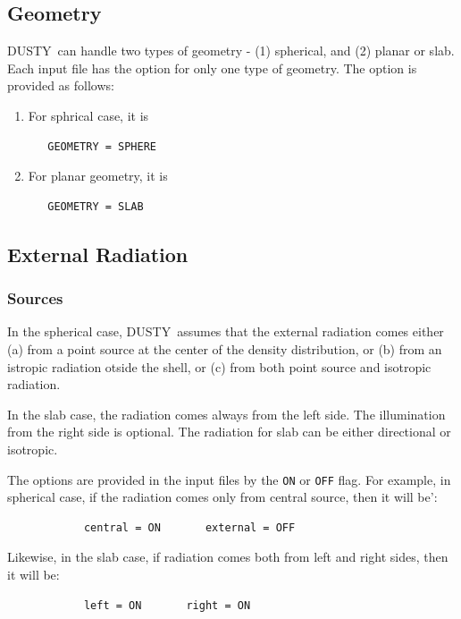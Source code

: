 \documentclass[11pt]{article}
\def\D  {{\sf DUSTY}}
\begin{document}
\subsection{Geometry}
\label{geometry}

\D\ can handle two types of geometry - (1) spherical, and (2) planar or slab. Each input
file has the option for only one type of geometry. The option is provided as follows:
%
\begin{enumerate}
%
\item
  For sphrical case, it is
\begin{verbatim}
   GEOMETRY = SPHERE
\end{verbatim}
%
\item
  For planar geometry, it is
\begin{verbatim}
   GEOMETRY = SLAB
\end{verbatim}
%
\end{enumerate}

\subsection{External Radiation}
\label{phy_parameters}

\subsubsection{Sources}
\label{sources}

In the spherical case, \D\ assumes that the external radiation comes either (a) from a
point source at the center of the density distribution, or (b) from an istropic
radiation otside the shell, or (c) from both point source and isotropic radiation.

In the slab case, the radiation comes always from the left side. The illumination from
the right side is optional. The radiation for slab can be either directional or isotropic.

The options are provided in the input files by the {\tt ON} or {\tt OFF} flag. For example,
in spherical case, if the radiation comes only from central source, then it will be':
%
\begin{verbatim}
            central = ON       external = OFF
\end{verbatim}

Likewise, in the slab case, if radiation comes both from left and right sides, then it will be:
%
\begin{verbatim}
            left = ON       right = ON
\end{verbatim}
%
\end{document}
